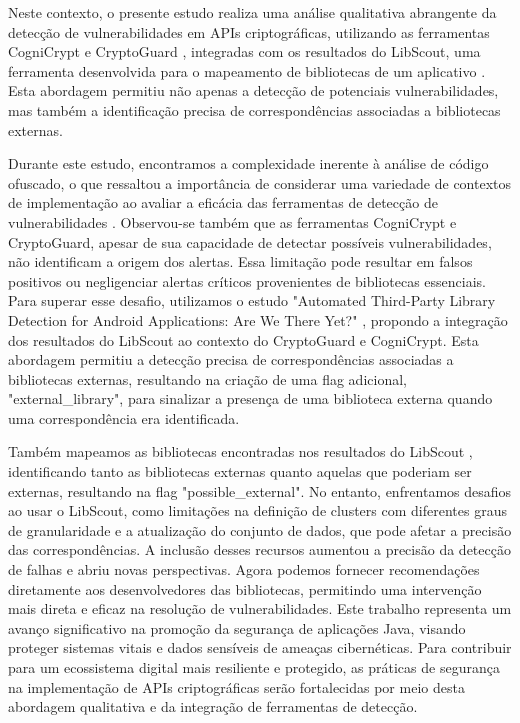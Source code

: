 Neste contexto, o presente estudo realiza uma análise qualitativa abrangente da detecção de vulnerabilidades em APIs criptográficas, utilizando as ferramentas CogniCrypt \cite{CogniCrypt} e CryptoGuard \cite{CryptoGuard}, integradas com os resultados do LibScout, uma ferramenta desenvolvida para o mapeamento de bibliotecas de um aplicativo \cite{LibScout}. Esta abordagem permitiu não apenas a detecção de potenciais vulnerabilidades, mas também a identificação precisa de correspondências associadas a bibliotecas externas.

Durante este estudo, encontramos a complexidade inerente à análise de código ofuscado, o que ressaltou a importância de considerar uma variedade de contextos de implementação ao avaliar a eficácia das ferramentas de detecção de vulnerabilidades \cite{api_tpl_zhang}. Observou-se também que as ferramentas CogniCrypt e CryptoGuard, apesar de sua capacidade de detectar possíveis vulnerabilidades, não identificam a origem dos alertas. Essa limitação pode resultar em falsos positivos ou negligenciar alertas críticos provenientes de bibliotecas essenciais. Para superar esse desafio, utilizamos o estudo "Automated Third-Party Library Detection for Android Applications: Are We There Yet?" \cite{api_tpl_zhang}, propondo a integração dos resultados do LibScout ao contexto do CryptoGuard e CogniCrypt. Esta abordagem permitiu a detecção precisa de correspondências associadas a bibliotecas externas, resultando na criação de uma flag adicional, "external\_library", para sinalizar a presença de uma biblioteca externa quando uma correspondência era identificada.

Também mapeamos as bibliotecas encontradas nos resultados do LibScout \cite{LibScout}, identificando tanto as bibliotecas externas quanto aquelas que poderiam ser externas, resultando na flag "possible\_external". No entanto, enfrentamos desafios ao usar o LibScout, como limitações na definição de clusters com diferentes graus de granularidade e a atualização do conjunto de dados, que pode afetar a precisão das correspondências. A inclusão desses recursos aumentou a precisão da detecção de falhas e abriu novas perspectivas. Agora podemos fornecer recomendações diretamente aos desenvolvedores das bibliotecas, permitindo uma intervenção mais direta e eficaz na resolução de vulnerabilidades. Este trabalho representa um avanço significativo na promoção da segurança de aplicações Java, visando proteger sistemas vitais e dados sensíveis de ameaças cibernéticas. Para contribuir para um ecossistema digital mais resiliente e protegido, as práticas de segurança na implementação de APIs criptográficas serão fortalecidas por meio desta abordagem qualitativa e da integração de ferramentas de detecção.

